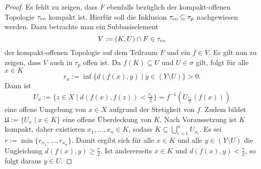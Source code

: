 \begin{proof}
  Es fehlt zu zeigen, dass $F$ ebenfalls bezüglich der kompakt-offenen Topologie $\tau_{\mathrm{co}}$ kompakt ist.
  Hierfür soll die Inklusion $\tau_{\mathrm{co}} \subseteq \tau_p$ nachgewiesen werden.
  Dazu betrachte man ein Subbasiselement 
  \begin{displaymath}
    V := (K,U) \cap F \in \tau_{\mathrm{co}}
  \end{displaymath}
  der kompakt-offenen Topologie auf dem Teilraum $F$ und ein $f \in V$.
  Es gilt nun zu zeigen, dass $V$ auch in $\tau_p$ offen ist.
  Da $f(K) \subseteq U$ und $U \in \sigma$ gilt, folgt für alle $x \in K$
  \begin{displaymath}
    r_x := \inf\{d(f(x),y) \mid y \in (Y \setminus U) \} > 0.
  \end{displaymath}
  Dann ist 
  \begin{displaymath}
    U_x := \{ z \in X \mid d(f(x),f(z)) < \tfrac{r_x}{2}\} = f^{-1}\left( U_{\tfrac{r_x}{2}}(f(x))\right)
  \end{displaymath} 
  eine offene Umgebung von $x \in X$ aufgrund der Stetigkeit von $f$.
  Zudem bildet $\mathfrak{U} := \{U_x \mid x \in K\}$ eine offene Überdeckung von $K$. 
  Nach Voraussetzung ist $K$ kompakt, daher existieren $x_1,\dots,x_n \in K$, sodass $K \subseteq \bigcup_{i=1}^n U_{x_i}$.
  Es sei $r:= \min\{r_{x_1},\dots,r_{x_n}\}$. 
  Damit ergibt sich für alle $x \in K$ und alle $y \in (Y \setminus U)$ die Ungleichung $d(f(x),y) \geq \tfrac{r}{2}$.
  Ist andererseits $x \in K$ und $d(f(x),y) < \tfrac{r}{2}$, so folgt daraus $y \in U$.


\end{proof}
